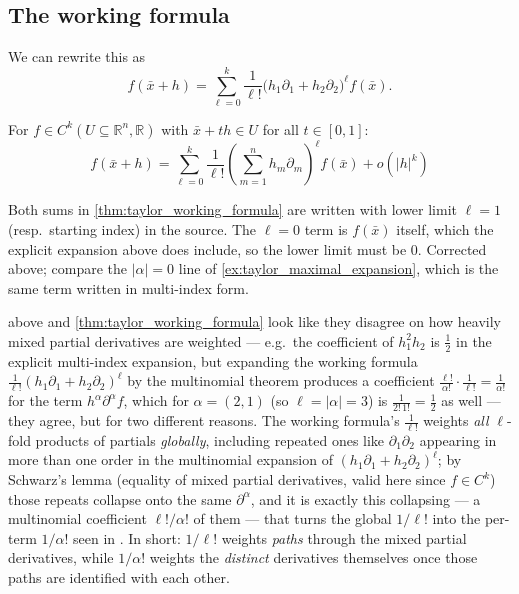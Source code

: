 \subsection{The working formula}

We can rewrite this as
\[f(\bar x + h) = \sum_{\ell=0}^{k}\frac{1}{\ell!}\big(h_1\partial_1 + h_2\partial_2\big)^\ell f(\bar x).\]

\begin{theorem}
\label{thm:taylor_working_formula}
For $f \in C^k(U \subseteq \mathbb{R}^n, \mathbb{R})$ with $\bar x + th \in U$ for all
$t \in [0,1]$:
\[f(\bar x + h) = \sum_{\ell=0}^{k}\frac{1}{\ell!}\left(\sum_{m=1}^{n} h_m\partial_m\right)^{\!\ell} f(\bar x) + o(|h|^k)\]
\end{theorem}

\begin{ainote}
Both sums in \cref{thm:taylor_working_formula} are written with lower limit $\ell = 1$ (resp.\
starting index) in the source. The $\ell = 0$ term is $f(\bar x)$ itself, which the explicit
expansion above does include, so the lower limit must be $0$. Corrected above; compare the
$|\alpha| = 0$ line of \cref{ex:taylor_maximal_expansion}, which is the same term written in
multi-index form.
\end{ainote}

\begin{remark}
 above and \cref{thm:taylor_working_formula} look like they
disagree on how heavily mixed partial derivatives are weighted --- e.g.\ the coefficient of
$h_1^2h_2$ is $\tfrac12$ in the explicit multi-index expansion, but expanding the working formula
$\tfrac{1}{\ell!}(h_1\partial_1+h_2\partial_2)^\ell$ by the multinomial theorem produces a
coefficient $\tfrac{\ell!}{\alpha!} \cdot \tfrac{1}{\ell!} = \tfrac{1}{\alpha!}$ for the term
$h^\alpha\partial^\alpha f$, which for $\alpha = (2,1)$ (so $\ell = |\alpha| = 3$) is
$\tfrac{1}{2!\,1!} = \tfrac12$ as well --- they agree, but for two different reasons. The working
formula's $\tfrac{1}{\ell!}$ weights \emph{all} $\ell$-fold products of partials \emph{globally},
including repeated ones like $\partial_1\partial_2$ appearing in more than one order in the
multinomial expansion of $(h_1\partial_1+h_2\partial_2)^\ell$; by Schwarz's lemma (equality of
mixed partial derivatives, valid here since $f \in C^k$) those repeats collapse onto the
same $\partial^\alpha$, and it is exactly this collapsing --- a multinomial coefficient
$\ell!/\alpha!$ of them --- that turns the global $1/\ell!$ into the per-term $1/\alpha!$ seen in
\Cref{ex:taylor_maximal_expansion}. In short: $1/\ell!$ weights \emph{paths} through the mixed
partial derivatives, while $1/\alpha!$ weights the \emph{distinct} derivatives themselves once
those paths are identified with each other.
\end{remark}

